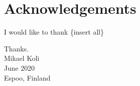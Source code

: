 \section*{Acknowledgements}

I would like to thank \{insert all\}

Thanks.\\

Mikael Koli\\
June 2020\\
Espoo, Finland\\
